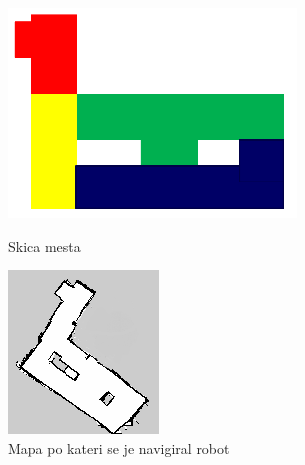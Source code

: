 \documentclass[a4paper,11pt]{article}
\begin{document}
\begin{figure}[!tbp]
  \centering
  \begin{minipage}[b]{0.2\textwidth}
	\includegraphics[scale=1]{city.png}
	\caption{Skica mesta}
  \end{minipage}
  \hfill
  \begin{minipage}[b]{0.2\textwidth}
	\includegraphics[scale=1]{robotMap.png}
	\caption{Mapa po kateri se je navigiral robot}
  \end{minipage}
\end{figure}
\end{document}
